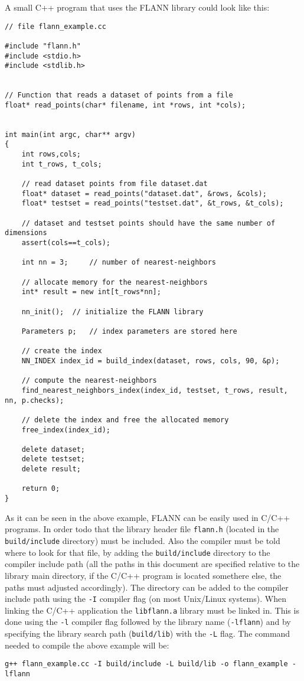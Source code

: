 \documentclass[letter,10pt]{article}
\begin{document}
A small C++ program that uses the FLANN library could look like this:

\begin{Verbatim}[fontsize=\footnotesize,frame=single]
// file flann_example.cc

#include "flann.h"
#include <stdio.h>
#include <stdlib.h>


// Function that reads a dataset of points from a file
float* read_points(char* filename, int *rows, int *cols);


int main(int argc, char** argv)
{
    int rows,cols;
    int t_rows, t_cols;

    // read dataset points from file dataset.dat
    float* dataset = read_points("dataset.dat", &rows, &cols);
    float* testset = read_points("testset.dat", &t_rows, &t_cols);

    // dataset and testset points should have the same number of dimensions
    assert(cols==t_cols);

    int nn = 3;     // number of nearest-neighbors

    // allocate memory for the nearest-neighbors 
    int* result = new int[t_rows*nn];

    nn_init();  // initialize the FLANN library

    Parameters p;   // index parameters are stored here

    // create the index
    NN_INDEX index_id = build_index(dataset, rows, cols, 90, &p);

    // compute the nearest-neighbors
    find_nearest_neighbors_index(index_id, testset, t_rows, result, nn, p.checks);

    // delete the index and free the allocated memory
    free_index(index_id);

    delete dataset;
    delete testset;
    delete result;

    return 0;
}

\end{Verbatim}

As it can be seen in the above example, FLANN can be easily used in C/C++ programs. In order todo that the library header file \texttt{flann.h} (located in the \texttt{build/include} directory) must be included. Also the compiler must be told where to look for that file, by adding the \texttt{build/include} directory to the compiler include path (all the paths in this document are specified relative to the library main directory, if the C/C++ program is located somethere else, the paths must adjusted accordingly). The directory can be added to the compiler include path using the \texttt{-I} compiler flag (on most Unix/Linux systems). When linking the C/C++ application the \texttt{libflann.a} library must be linked in. This is done using the \texttt{-l} compiler flag followed by the library name (\texttt{-lflann}) and by specifying the library search path (\texttt{build/lib}) with the \texttt{-L} flag. The command needed to compile the above example will be:
\begin{Verbatim}[fontsize=\footnotesize]
g++ flann_example.cc -I build/include -L build/lib -o flann_example -lflann
\end{Verbatim}
\end{document}
